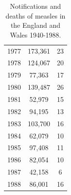 \documentclass[a4paper,11pt] {scrartcl}
\begin{document}
\begin{table} [hp]
\begin{tabular}{c c c}
1977 & 173,361 & 23 \\ 
1978 & 124,067 & 20 \\ 
1979 & 77,363 & 17 \\ 
1980 & 139,487 & 26 \\ 
1981 & 52,979 & 15 \\ 
1982 & 94,195 & 13 \\ 
1983 & 103,700 & 16\\ 
1984 & 62,079 & 10 \\ 
1985 & 97,408 & 11 \\ 
1986 & 82,054 & 10 \\ 
1987 & 42,158 & 6 \\ 
1988 & 86,001 & 16 \\ 
\bottomrule
\end{tabular}
\caption{Notifications and deaths of measles in the England and Wales 1940-1988\cite{hpameaslesnotificationsanddeaths}.}
\label{mmrnotifications1989}
\end{table}
\end{document}

